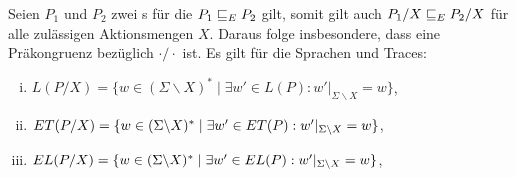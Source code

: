 \begin{Satz}
  Seien $P_1$ und $P_2$ zwei \MEIO{}s für die $P_1 \sqsubseteq  _E P_2$ gilt, somit gilt
  auch $P_1/X \sqsubseteq  _E P_2/X$ für alle zulässigen Aktionsmengen $X$. Daraus folge
  insbesondere, dass \ERel{} eine Präkongruenz bezüglich $\cdot /\cdot$ ist. Es
  gilt für die Sprachen und Traces:
  \begin{enumerate}[(i)]
    \item $L(P/X) = \{w\in (\Sigma\backslash X)^*\mid \exists w'\in L(P):
      w'|_{\Sigma\backslash X} = w\}$,
    \item $ET (P/X) = \{w\in (\Sigma\backslash X)^*\mid \exists w'\in ET(P):
      w'|_{\Sigma\backslash X} = w\}$,
    \item $EL (P/X) = \{w\in (\Sigma\backslash X)^*\mid \exists w'\in EL(P):
      w'|_{\Sigma\backslash X} = w\}$,
  \end{enumerate}
\end{Satz}
